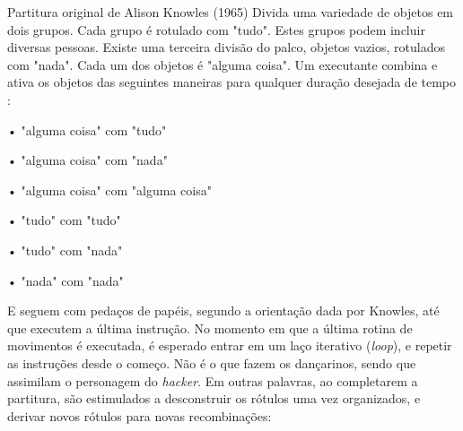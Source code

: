 \begin{example}{Partitura original de Alison Knowles (1965)}\label{code:knowles}
\scriptsize
Divida uma variedade de objetos em dois grupos. 
Cada grupo é rotulado com "tudo". 
Estes grupos podem incluir diversas pessoas. 
Existe uma terceira divisão do palco, objetos vazios, rotulados com "nada". 
Cada um dos objetos é "alguma coisa". 
Um executante combina e ativa os objetos das seguintes maneiras para qualquer duração desejada de tempo :

• "alguma coisa" com "tudo"

• "alguma coisa" com "nada"

• "alguma coisa" com "alguma coisa"

• "tudo" com "tudo"

• "tudo" com "nada"

• "nada" com "nada"
\end{example}

E seguem com pedaços de papéis, segundo a orientação dada por Knowles, até que executem a última instrução. No momento em que a última rotina de movimentos é executada, é esperado entrar em um laço iterativo (\emph{loop}), e repetir as instruções desde o começo. Não é o que fazem os dançarinos, sendo que assimilam o personagem do \emph{hacker}. Em outras palavras, ao completarem a partitura, são estimulados a desconstruir os rótulos uma vez organizados, e derivar novos rótulos para novas recombinações:

\begin{citacao}
\end{citacao}

